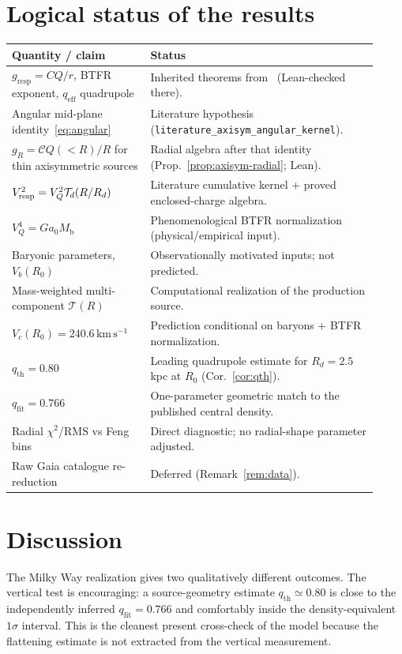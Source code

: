 \documentclass[11pt]{article}
\theoremstyle{definition}
\theoremstyle{remark}
\newcommand{\kms}{\mathrm{km\,s^{-1}}}
\newcommand{\Mb}{M_{\mathrm{b}}}
\newcommand{\qeff}{q_{\mathrm{eff}}}
\newcommand{\qth}{q_{\mathrm{th}}}
\newcommand{\qfit}{q_{\mathrm{fit}}}
\begin{document}
\section{Logical status of the results}
\label{sec:status}
\begin{center}
\small
\begin{tabular}{@{}p{0.34\linewidth}p{0.58\linewidth}@{}}
\toprule
\textbf{Quantity / claim} & \textbf{Status}\\
\midrule
$g_{\mathrm{resp}}=CQ/r$, BTFR exponent, $\qeff$ quadrupole & Inherited theorems from~\cite{boyd2026galactic} (Lean-checked there).\\
Angular mid-plane identity~\eqref{eq:angular} & Literature hypothesis (\texttt{literature\_axisym\_angular\_kernel}).\\
$g_R=\mathcal C Q(<R)/R$ for thin axisymmetric sources & Radial algebra after that identity (Prop.~\ref{prop:axisym-radial}; Lean).\\
$V_{\rm resp}^2=V_Q^2\mathcal T_d(R/R_d)$ & Literature cumulative kernel + proved enclosed-charge algebra.\\
$V_Q^4=Ga_0\Mb$ & Phenomenological BTFR normalization (physical/empirical input).\\
Baryonic parameters, $V_b(R_0)$ & Observationally motivated inputs; not predicted.\\
Mass-weighted multi-component $\mathcal T(R)$ & Computational realization of the production source.\\
$V_c(R_0)=240.6\,\kms$ & Prediction conditional on baryons + BTFR normalization.\\
$\qth=0.80$ & Leading quadrupole estimate for $R_d=2.5\,$kpc at $R_0$ (Cor.~\ref{cor:qth}).\\
$\qfit=0.766$ & One-parameter geometric match to the published central density.\\
Radial $\chi^2$/RMS vs Feng bins & Direct diagnostic; no radial-shape parameter adjusted.\\
Raw Gaia catalogue re-reduction & Deferred (Remark~\ref{rem:data}).\\
\bottomrule
\end{tabular}
\end{center}

\section{Discussion}
\label{sec:discussion}
The Milky Way realization gives two qualitatively different outcomes.
The vertical test is encouraging: a source-geometry estimate $\qth\simeq0.80$ is close to the independently inferred $\qfit=0.766$ and comfortably inside the density-equivalent $1\sigma$ interval.
This is the cleanest present cross-check of the model because the flattening estimate is not extracted from the vertical measurement.
\end{document}
